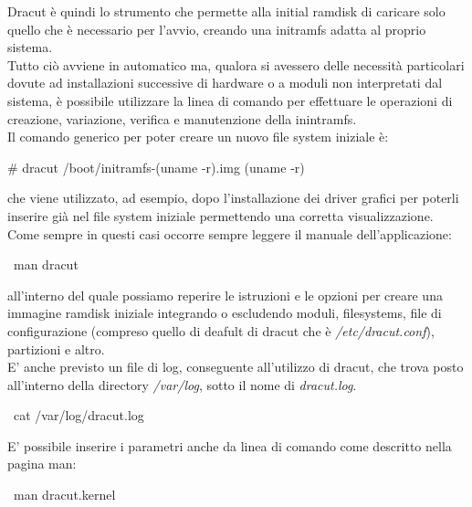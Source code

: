 Dracut è quindi lo strumento che permette alla initial ramdisk di caricare solo quello che è necessario per l'avvio, creando una initramfs adatta al proprio sistema.\\

Tutto ciò avviene in automatico ma, qualora si avessero delle necessità particolari dovute ad installazioni successive di hardware o a moduli non interpretati dal sistema, è possibile utilizzare la linea di comando per effettuare le operazioni di creazione, variazione, verifica e manutenzione della inintramfs.\\

Il comando generico per poter creare un nuovo file system iniziale è:
\begin{shaded}
{\color[cmyk]{0, 0, 0, 0}\# dracut /boot/initramfs-\textdollar(uname -r).img \textdollar(uname -r)}\\
\end{shaded}

che viene utilizzato, ad esempio, dopo l'installazione dei driver grafici per poterli inserire già nel file system iniziale permettendo una corretta visualizzazione. \\

Come sempre in questi casi occorre sempre leggere il manuale dell'applicazione:

\begin{shaded}
{\color[cmyk]{0, 0, 0, 0}\textdollar\ man dracut}
\end{shaded}

all'interno del quale possiamo reperire le istruzioni e le opzioni per creare una immagine ramdisk iniziale integrando o escludendo moduli, filesystems, file di configurazione (compreso quello di deafult di dracut che è {\itshape /etc/dracut.conf}), partizioni e altro.\\

E' anche previsto un file di log, conseguente all'utilizzo di dracut, che trova posto all'interno della
directory {\itshape /var/log}, sotto il nome di {\itshape dracut.log}.

\begin{shaded}
{\color[cmyk]{0, 0, 0, 0}\textdollar\ cat  /var/log/dracut.log}
\end{shaded}

E' possibile inserire i parametri anche da linea di comando come descritto nella
pagina man:

\begin{shaded}
{\color[cmyk]{0, 0, 0, 0}\textdollar\ man dracut.kernel}
\end{shaded}

